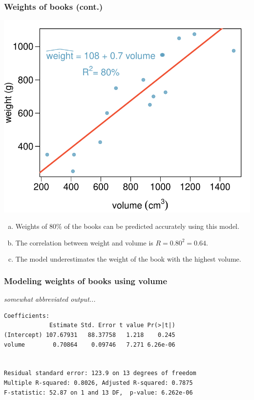 
\begin{frame}
\frametitle{Weights of books (cont.)}

{
}
{
\begin{center}
\includegraphics[width=\textwidth]{9-1_intro_mlr/figures/books/weight_volume}
\end{center}
}

\begin{enumerate}[(a)]
\item Weights of 80\% of the books can be predicted accurately using this model.
\item The correlation between weight and volume is $R = 0.80^2 = 0.64$.
\item The model underestimates the weight of the book with the highest volume.
\end{enumerate}

\end{frame}


\begin{frame}[fragile]
\frametitle{Modeling weights of books using volume}

{\small \textit{somewhat abbreviated output...}}

\begin{verbatim}
Coefficients:
             Estimate Std. Error t value Pr(>|t|)    
(Intercept) 107.67931   88.37758   1.218    0.245    
volume        0.70864    0.09746   7.271 6.26e-06


Residual standard error: 123.9 on 13 degrees of freedom
Multiple R-squared: 0.8026,	Adjusted R-squared: 0.7875 
F-statistic: 52.87 on 1 and 13 DF,  p-value: 6.262e-06 
\end{verbatim}

\end{frame}

